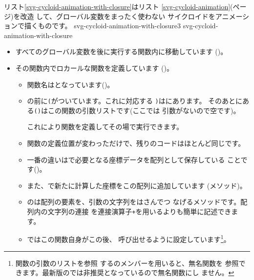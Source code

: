 リスト\ref{svg-cycloid-animation-with-closure}はリスト
\ref{svg-cycloid-animation}(\pageref{svg-cycloid-animation}ページ)を改造
して、グローバル変数をまったく使わない
サイクロイドをアニメーションで描くものです。
{svg-cycloid-animation-with-closure3}
{svg-cycloid-animation-with-closure}
\begin{itemize}
 \item すべてのグローバル変数を後に実行する関数内に移動しています
       ()。
 \item その関数内でロカールな関数を定義しています
			 ()。
\begin{itemize}
 \item 関数名はとなっています()。
 \item {}の前に\texttt{(}がついています。これに対応する
			 \texttt{)}はにあります。
  そのあとにある\texttt{()}はこの関数の引数リストです(ここでは
			 引数がないので空です)。
			 
  これにより関数を定義してその場で実行できます。
 \item 関数の定義位置が変わっただけで、残りのコードはほとんど同じです。
 \item 一番の違いはで必要となる座標データを配列として保存している
			 ことです()。
 \item また、で新たに計算した座標をこの配列に追加しています
			 (メソッド)。
 \item {}のは配列の要素を、引数の文字列をはさんでつ
       なげるメソッドです。配列内の文字列の連接
       を連接演算子\texttt{+}を用いるよりも簡単に記述できます。
 \item {}ではこの関数自身がこの後、
			 呼び出せるように設定しています\footnote{関数の引数のリストを参照
			 するのメンバーを用いると、無名関数を
			 参照できます。最新版の\JS では非推奨となっているので無名関数にし
			 ません。}。
\end{itemize}

\end{itemize}
